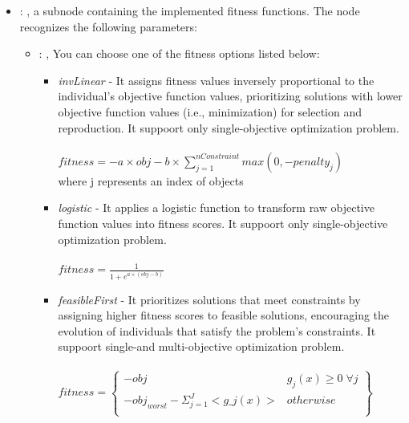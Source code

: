 \begin{itemize}
\begin{itemize}
        \item {}: ,
          a subnode containing the implemented fitness functions.
          The  node recognizes the following parameters:
            \begin{itemize}
              \item {}: ,
                You can choose one of the fitness options listed below:
                \begin{itemize}                         \item \textit{invLinear} - It assigns
                fitness values inversely proportional to the individual's objective function values,
                prioritizing solutions with lower objective function values (i.e., minimization) for
                selection and reproduction. It suppoort only single-objective optimization
                problem.\\\\                         $fitness = -a \times obj - b \times
                \sum_{j=1}^{nConstraint} max(0,-penalty_{j}) $\\                         where j
                represents an index of objects                         \\
                \item \textit{logistic} - It applies a logistic function to transform raw objective
                function values into fitness scores.  It suppoort only single-objective optimization
                problem.\\\\                         $fitness = \frac{1}{1+e^{a\times(obj-b)}}$\\
                \item \textit{feasibleFirst} - It prioritizes solutions that meet constraints by
                assigning higher fitness scores to feasible solutions,
                encouraging the evolution of individuals that satisfy the problem's constraints.  It
                suppoort single-and multi-objective optimization problem.\\\\
                $fitness = \left\{\begin{matrix} -obj & g_{j}(x)\geq 0 \; \forall j \\ -obj_{worst}-
                \Sigma_{j=1}^{J}<g\_j(x)> & otherwise \\ \end{matrix}\right\}$\\
                \end{itemize}
          \end{itemize}


\end{itemize}
\end{itemize}
